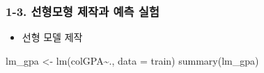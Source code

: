 \documentclass[
  letterpaper,
  DIV=11,
  numbers=noendperiod]{scrartcl}
\newenvironment{Shaded}{\begin{snugshade}}{\end{snugshade}}
\newcommand{\AttributeTok}[1]{\textcolor[rgb]{0.40,0.45,0.13}{#1}}
\newcommand{\FunctionTok}[1]{\textcolor[rgb]{0.28,0.35,0.67}{#1}}
\newcommand{\NormalTok}[1]{\textcolor[rgb]{0.00,0.23,0.31}{#1}}
\newcommand{\OtherTok}[1]{\textcolor[rgb]{0.00,0.23,0.31}{#1}}
\newcommand{\SpecialCharTok}[1]{\textcolor[rgb]{0.37,0.37,0.37}{#1}}
\providecommand{\tightlist}{%
  \setlength{\itemsep}{0pt}\setlength{\parskip}{0pt}}\usepackage{longtable,booktabs,array}
\begin{document}
\subsubsection{1-3. 선형모형 제작과 예측
실험}\label{uxc120uxd615uxbaa8uxd615-uxc81cuxc791uxacfc-uxc608uxce21-uxc2e4uxd5d8}

\begin{itemize}
\tightlist
\item
  선형 모델 제작
\end{itemize}

\begin{Shaded}
\begin{Highlighting}[]
\NormalTok{lm\_gpa }\OtherTok{\textless{}{-}} \FunctionTok{lm}\NormalTok{(colGPA}\SpecialCharTok{\textasciitilde{}}\NormalTok{., }\AttributeTok{data =}\NormalTok{ train)}
\FunctionTok{summary}\NormalTok{(lm\_gpa)}
\end{Highlighting}
\end{Shaded}
\end{document}
